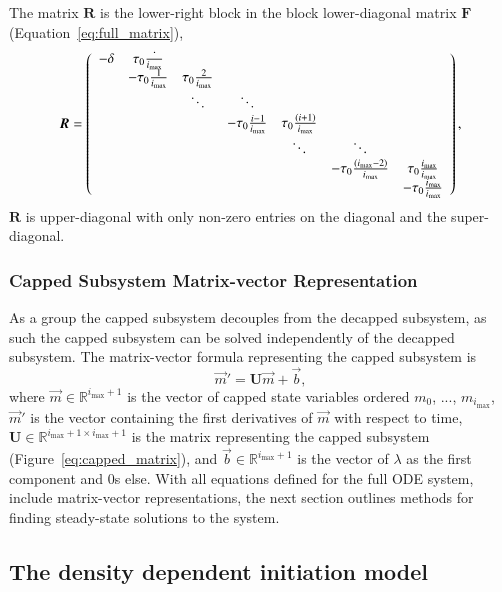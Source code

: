 \documentclass[review]{elsarticle}
\newcommand{\imax}{\ensuremath{{i_{\max}}}\xspace}
\let\bs\boldsymbol
\begin{document}
The matrix $\bs{R}$ is the lower-right block in the block lower-diagonal matrix $\bs{F}$ (Equation~\ref{eq:full_matrix}),
\begin{equation}
\bs{R}=\left(
\begin{array}{ccccccc}
-\delta & \tau_0\frac{`}{\imax} & & & & & \\
 & -\tau_0\frac{1}{\imax} & \tau_0\frac{2}{\imax} & & & &\\
 & & \ddots & \ddots & & & \\
 & & & -\tau_0\frac{i-1}{\imax} & \tau_0\frac{(i+1)}{\imax} & & \\
 & & & & \ddots & \ddots & \\
 & & & & & -\tau_0\frac{(\imax-2)}{\imax} & \tau_0\frac{\imax}{\imax} \\
 & & & & & & -\tau_0\frac{\imax}{\imax} \\
\end{array}
\right),
\end{equation}
$\bs{R}$ is upper-diagonal with only non-zero entries on the diagonal and the super-diagonal.

\subsubsection{Capped Subsystem Matrix-vector Representation}
As a group the capped subsystem decouples from the decapped subsystem, as such the capped subsystem can be solved independently of the decapped subsystem.  
The matrix-vector formula representing the capped subsystem is \begin{equation}
\vec{m}'=\bs{U}\vec{m}+\vec{b},\end{equation} where $\vec{m}\in\mathbb{R}^{\imax+1}$ is the vector of capped state variables ordered $m_0$, ..., $m_{\imax}$, $\vec{m}'$ is the vector containing the first derivatives of $\vec{m}$ with respect to time, $\bs{U}\in\mathbb{R}^{\imax+1\times \imax+1}$ is the matrix representing the capped subsystem (Figure~\ref{eq:capped_matrix}), and $\vec{b}\in\mathbb{R}^{\imax+1}$ is the vector of $\lambda$ as the first component and 0s else.
With all equations defined for the full ODE system, include matrix-vector representations, the next section outlines methods for finding steady-state solutions to the system.

\subsection{The density dependent initiation model}
\end{document}
